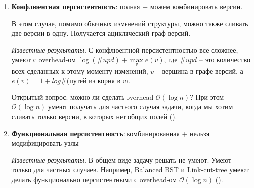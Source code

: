 \begin{enumerate}
{\it Известные результаты.} Если у структуры данных константная входящая степень для всех узлов, то ее можно наделить полной персистентностью также с константным мультипликативным overhead-ом. Правда в случае полной персистентности такого overhead-а умеют добиваться только амортизированно (\cite{driscoll1986making}), и можно ли добиться его в худшем случае --- открытый вопрос.  

\item {\bf Конфлюентная персистентность}: полная + можем комбинировать версии.

В этом случае, помимо обычных изменений структуры, можно также сливать две версии в одну. 
Получается ациклический граф версий.

\begin{figure}[h] \centering
{}
\end{figure}


{\it Известные результаты.} С конфлюентной персистентностью все сложнее, \cite{fiat2003making} умеют с overhead-ом $\log(\#upd) + \max\limits_v e(v)$, 
где $\#upd$ -- это количество всех сделанных к этому моменту изменений, $v$ -- вершина в графе версий, а $e(v) = 1 + log\#$(путей из корня в $v$).

Открытый вопрос: можно ли сделать overhead $\mathcal{O}(\log n)$?
При этом $\mathcal{O}(\log n)$ умеют получать для частного случая задачи, когда мы хотим сливать только версии, в которых нет общих полей (\cite{collette2012confluent}).

\item {\bf Функциональная персистентность}: комбинированная + нельзя модифицировать узлы

{\it Известные результаты.} В общем виде задачу решать не умеют.
Умеют только для частных случаев. Например, Balanced BST и Link-cut-tree умеют делать функционально персистентными с overhead-ом $\mathcal{O}(\log n)$ (\cite{demaine2008confluently}).

\end{enumerate}


